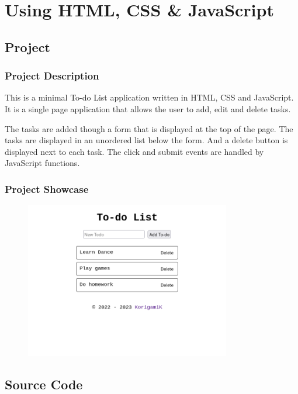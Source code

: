 \section{Using HTML, CSS \& JavaScript}\label{sec:todo}

\subsection{Project}

\subsubsection*{Project Description}

This is a minimal To-do List application written in HTML, CSS and JavaScript. It is a single page application that allows the user to add, edit and delete tasks.

The tasks are added though a form that is displayed at the top of the page.
The tasks are displayed in an unordered list below the form. And a delete button is displayed next to each task.
The click and submit events are handled by JavaScript functions.

\subsubsection*{Project Showcase}

\begin{figure}[ht]
    \centering
    \includegraphics[width=0.8\textwidth]{res/todo-list.png}
\end{figure}

\pagebreak

\subsection{Source Code}

\inputminted[linenos, breaklines, encoding=utf8, frame=lines]{html}{"./code/todo-list.html"}


\pagebreak
